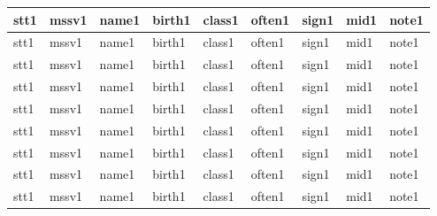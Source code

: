 \documentclass[14pt,a4paper]{article}
\begin{document}
\begin{tabular}{ m{0.7cm} | m{2cm}| m{4cm} | m{2cm} | m{2.5cm} | m{1.2cm} | m{1.5cm} | m{1cm} | m{1.6cm} | }
		\hline
		stt1 & mssv1 & name1 & birth1 & class1 & often1 & sign1 & mid1 & note1\\
		\hline
		stt1 & mssv1 & name1 & birth1 & class1 & often1 & sign1 & mid1 & note1\\
		\hline
		stt1 & mssv1 & name1 & birth1 & class1 & often1 & sign1 & mid1 & note1\\
		\hline
		stt1 & mssv1 & name1 & birth1 & class1 & often1 & sign1 & mid1 & note1\\
		\hline
		stt1 & mssv1 & name1 & birth1 & class1 & often1 & sign1 & mid1 & note1\\
		\hline
		stt1 & mssv1 & name1 & birth1 & class1 & often1 & sign1 & mid1 & note1\\
		\hline
		stt1 & mssv1 & name1 & birth1 & class1 & often1 & sign1 & mid1 & note1\\
		\hline
		stt1 & mssv1 & name1 & birth1 & class1 & often1 & sign1 & mid1 & note1\\
		\hline
		stt1 & mssv1 & name1 & birth1 & class1 & often1 & sign1 & mid1 & note1\\
		\bottomrule[0.4mm]
\end{tabular}
\newpage
\end{document}
